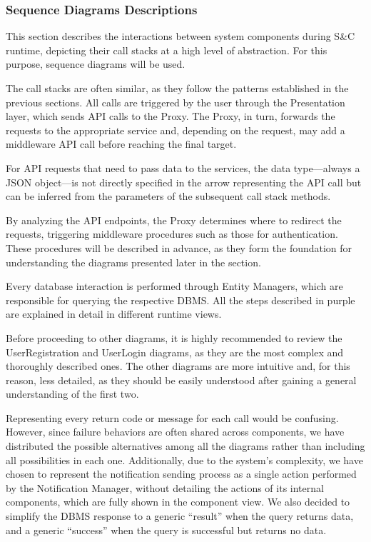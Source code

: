 \subsubsection*{Sequence Diagrams Descriptions}

This section describes the interactions between system components during S\&C runtime, depicting their call stacks at a high level of abstraction. For this purpose, sequence diagrams will be used.

\noindent The call stacks are often similar, as they follow the patterns established in the previous sections. All calls are triggered by the user through the Presentation layer, which sends API calls to the Proxy. The Proxy, in turn, forwards the requests to the appropriate service and, depending on the request, may add a middleware API call before reaching the final target.

\noindent For API requests that need to pass data to the services, the data type—always a JSON object—is not directly specified in the arrow representing the API call but can be inferred from the parameters of the subsequent call stack methods.

\noindent By analyzing the API endpoints, the Proxy determines where to redirect the requests, triggering middleware procedures such as those for authentication. These procedures will be described in advance, as they form the foundation for understanding the diagrams presented later in the section.

\noindent Every database interaction is performed through Entity Managers, which are responsible for querying the respective DBMS. All the steps described in purple are explained in detail in different runtime views.

\noindent Before proceeding to other diagrams, it is highly recommended to review the UserRegistration and UserLogin diagrams, as they are the most complex and thoroughly described ones. The other diagrams are more intuitive and, for this reason, less detailed, as they should be easily understood after gaining a general understanding of the first two.

\noindent Representing every return code or message for each call would be confusing. However, since failure behaviors are often shared across components, we have distributed the possible alternatives among all the diagrams rather than including all possibilities in each one. Additionally, due to the system's complexity, we have chosen to represent the notification sending process as a single action performed by the Notification Manager, without detailing the actions of its internal components, which are fully shown in the component view. We also decided to simplify the DBMS response to a generic “result” when the query returns data, and a generic “success” when the query is successful but returns no data.

